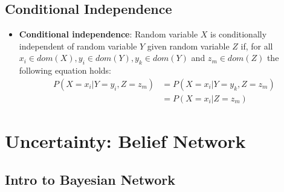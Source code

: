 \documentclass{article}
\begin{document}
\subsection{Conditional Independence}

\begin{itemize}
    \item \textbf{Conditional independence}: Random variable $X$ is conditionally independent of random variable $Y$ given random variable $Z$ if, for all $x_i \in dom(X), y_i \in dom(Y), y_k \in dom(Y)$ and $z_m \in dom(Z)$ the following equation holds:
    \begin{align*}
        P(X = x_i|Y = y_i, Z = z_m) &= P(X = x_i|Y = y_k, Z = z_m) \\
        &= P(X = x_i|Z = z_m)
    \end{align*}
\end{itemize}

\section{Uncertainty: Belief Network}

\subsection{Intro to Bayesian Network}
\end{document}
